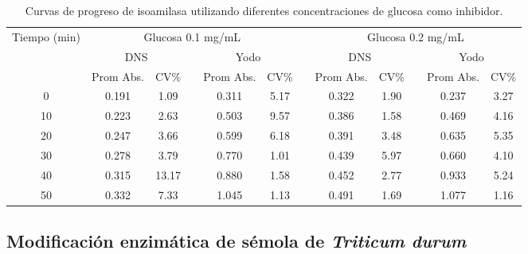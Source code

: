 \documentclass{article}
\begin{document}
\begin{table}[H]
	\centering
	\caption{Curvas de progreso de isoamilasa utilizando diferentes concentraciones de glucosa como inhibidor.}
		\begin{adjustbox}{width=\textwidth}
	\begin{tabular}{cccccccccccc}
		\toprule
		\multicolumn{1}{c}{\multirow{3}[6]{*}{Tiempo (min)}} & \multicolumn{5}{c}{Glucosa 0.1 mg/mL} &       & \multicolumn{5}{c}{Glucosa 0.2 mg/mL} \\
		\cmidrule{2-6}\cmidrule{8-12}          & \multicolumn{2}{c}{DNS} &       & \multicolumn{2}{c}{Yodo} &       & \multicolumn{2}{c}{DNS} &       & \multicolumn{2}{c}{Yodo} \\
		\cmidrule{2-3}\cmidrule{5-6}\cmidrule{8-9}\cmidrule{11-12}          & Prom Abs. & CV\%  &       & Prom Abs. & CV\%  &       & Prom Abs. & CV\%  &       & Prom Abs. & CV\% \\
		\midrule
		0     & 0.191 & 1.09  &       & 0.311 & 5.17  &       & 0.322 & 1.90  &       & 0.237 & 3.27 \\
		10    & 0.223 & 2.63  &       & 0.503 & 9.57  &       & 0.386 & 1.58  &       & 0.469 & 4.16 \\
		20    & 0.247 & 3.66  &       & 0.599 & 6.18  &       & 0.391 & 3.48  &       & 0.635 & 5.35 \\
		30    & 0.278 & 3.79  &       & 0.770 & 1.01  &       & 0.439 & 5.97  &       & 0.660 & 4.10 \\
		40    & 0.315 & 13.17 &       & 0.880 & 1.58  &       & 0.452 & 2.77  &       & 0.933 & 5.24 \\
		50    & 0.332 & 7.33  &       & 1.045 & 1.13  &       & 0.491 & 1.69  &       & 1.077 & 1.16 \\
		\bottomrule
	\end{tabular}%
	\end{adjustbox}
	\label{tab:c4}%
\end{table}%



\subsection{Modificación enzimática de sémola de \textit{Triticum durum}}
\end{document}
